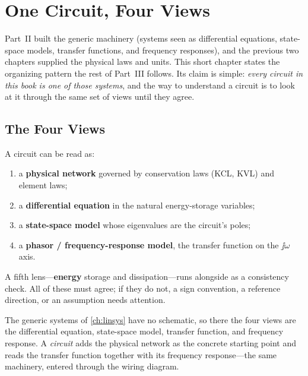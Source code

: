 \chapter{One Circuit, Four Views}
\label{ch:fourviews}
Part~II built the generic machinery (systems seen as differential equations,
state-space models, transfer functions, and frequency responses), and the
previous two chapters supplied the physical laws and units. This short chapter
states the organizing pattern the rest of Part~III follows. Its claim is simple:
\emph{every circuit in this book is one of those systems}, and the way to
understand a circuit is to look at it through the same set of views until they
agree.

\section{The Four Views}
A circuit can be read as:
\begin{enumerate}
\item a \textbf{physical network} governed by conservation laws (KCL, KVL) and
element laws;
\item a \textbf{differential equation} in the natural energy-storage variables;
\item a \textbf{state-space model} whose eigenvalues are the circuit's poles;
\item a \textbf{phasor / frequency-response model}, the transfer function on the
\(\jj\omega\) axis.
\end{enumerate}
A fifth lens---\textbf{energy} storage and dissipation---runs alongside as a
consistency check. All of these must agree; if they do not, a sign convention, a
reference direction, or an assumption needs attention.

The generic systems of \cref{ch:linsys} have no schematic, so there the four
views are the differential equation, state-space model, transfer function, and
frequency response. A \emph{circuit} adds the physical network as the concrete
starting point and reads the transfer function together with its frequency
response---the same machinery, entered through the wiring diagram.

